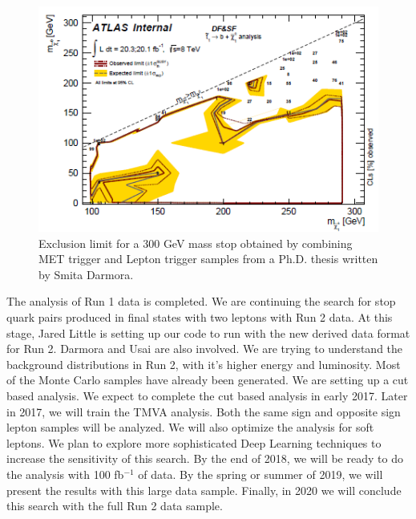 \begin{figure}[hbt]
\begin{center}
  \includegraphics[width=5in]{De/smita_limit.png}
  \caption{Exclusion limit for a 300 GeV mass stop obtained by combining MET trigger and Lepton trigger samples from a Ph.D.  thesis written by Smita Darmora.}
  \label{smita_limit}
\end{center}
\end{figure}

The analysis of Run 1 data is completed. We are continuing the search for stop quark pairs produced in final states with two leptons with Run 2 data. At this stage, Jared Little is setting up our code to run with the new derived data format for Run 2. Darmora and Usai are also involved. We are trying to understand the background distributions in Run 2, with it's higher energy and luminosity. Most of the Monte Carlo samples have already been generated. We are setting up a cut based analysis. We expect to complete the cut based analysis in early 2017. Later in 2017, we will train the TMVA analysis. Both the same sign and opposite sign lepton samples will be analyzed. We will also optimize the analysis for soft leptons. We plan to explore more sophisticated Deep Learning techniques to increase the sensitivity of this search. By the end of 2018, we will be ready to do the analysis with 100 fb$^{-1}$ of data. By the spring or summer of 2019, we will present the results with this large data sample. Finally, in 2020 we will conclude this search with the full Run 2 data sample.